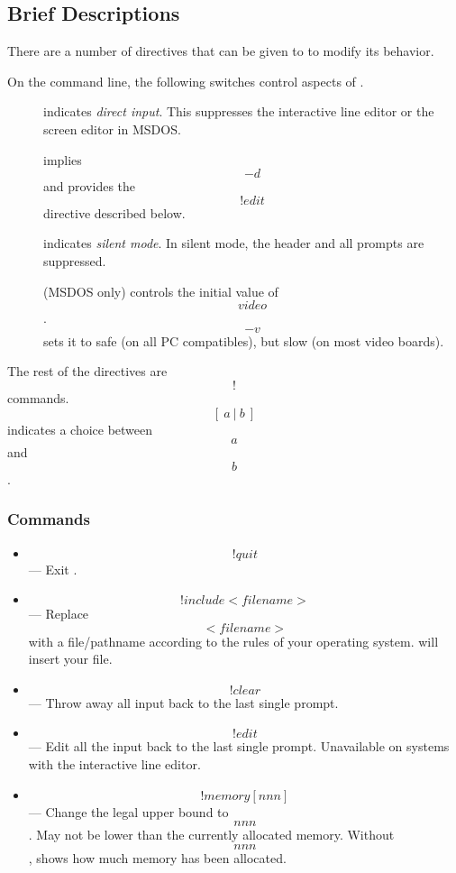 {\subsection{Brief Descriptions}
There are a number of directives that can be given to \ISETL{} to modify
its behavior.

\label{flags}
On the command line, the following switches control aspects of \ISETL\@.
\begin{description}
\item[] indicates {\em direct input}.  This suppresses the interactive
line editor or the screen editor in MSDOS.

\item[] implies \[-d\] and provides the \[!edit\] directive
described below.

\item[] indicates {\em silent mode\/}.
In silent mode, the header and all prompts are suppressed.

\item[] (MSDOS only) controls the initial value of \[video\].
\[-v\] sets it to safe (on all PC compatibles), but slow (on most
video boards).


\end{description}

\noindent
The rest of the directives are \[!\] commands.
\[[~a~|~b~]\] indicates a choice between \[a\] and \[b\].

\subsubsection{Commands}
\begin{itemize}
\item{}
\[!quit\] --- Exit \ISETL{}\@.

\item{}
\[!include <filename>\] --- Replace \[<filename>\] with a file/pathname
according to the rules of your operating system.
\ISETL{} will insert your file.

\item{}
\[!clear\] --- Throw away all input back to the last single prompt.

\item{}
\[!edit\] --- Edit all the input back to the last single prompt.
Unavailable on systems with the interactive line editor.

\item
\[!memory [nnn]\] --- Change the legal upper bound to \[nnn\].
May not be lower than the currently allocated memory.
Without \[nnn\],  shows how much memory has been allocated.


\end{itemize}}
